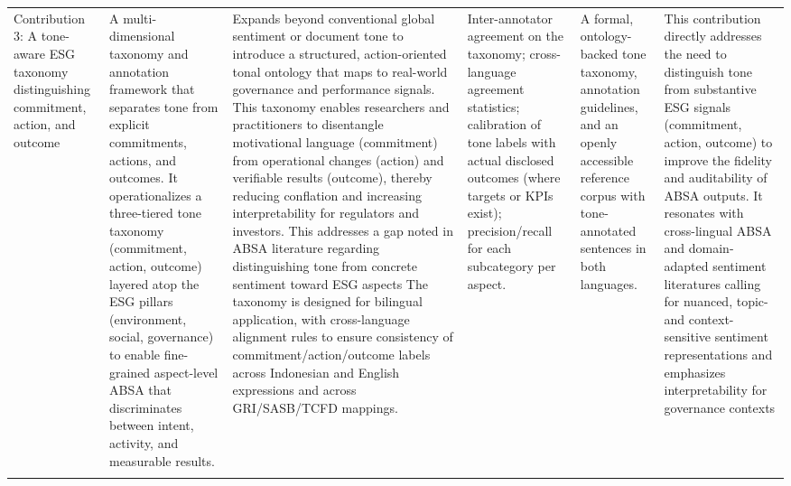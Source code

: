 \begin{landscape}
\begin{longtable}{p{2cm} p{3cm} p{6cm} p{3cm} p{3cm} p{6cm}}
\addlinespace
Contribution 3: A tone-aware ESG taxonomy distinguishing commitment, action, and outcome & A multi-dimensional taxonomy and annotation framework that separates tone from explicit commitments, actions, and outcomes. It operationalizes a three-tiered tone taxonomy (commitment, action, outcome) layered atop the ESG pillars (environment, social, governance) to enable fine-grained aspect-level ABSA that discriminates between intent, activity, and measurable results. & Expands beyond conventional global sentiment or document tone to introduce a structured, action-oriented tonal ontology that maps to real-world governance and performance signals. This taxonomy enables researchers and practitioners to disentangle motivational language (commitment) from operational changes (action) and verifiable results (outcome), thereby reducing conflation and increasing interpretability for regulators and investors. This addresses a gap noted in ABSA literature regarding distinguishing tone from concrete sentiment toward ESG aspects \cite{10.1002/csr.70089,10.2139/ssrn.3738629,10.1108/mf-01-2023-0020} The taxonomy is designed for bilingual application, with cross-language alignment rules to ensure consistency of commitment/action/outcome labels across Indonesian and English expressions and across GRI/SASB/TCFD mappings. & Inter-annotator agreement on the taxonomy; cross-language agreement statistics; calibration of tone labels with actual disclosed outcomes (where targets or KPIs exist); precision/recall for each subcategory per aspect. & A formal, ontology-backed tone taxonomy, annotation guidelines, and an openly accessible reference corpus with tone-annotated sentences in both languages. & This contribution directly addresses the need to distinguish tone from substantive ESG signals (commitment, action, outcome) to improve the fidelity and auditability of ABSA outputs. It resonates with cross-lingual ABSA and domain-adapted sentiment literatures calling for nuanced, topic- and context-sensitive sentiment representations and emphasizes interpretability for governance contexts \cite{10.1016/j.inffus.2025.103073,10.1111/eufm.12509,10.48550/arxiv.2511.00024,10.3390/math12193119,10.1002/csr.70089,10.2139/ssrn.3738629} \\
\addlinespace

\end{longtable}
\end{landscape}
